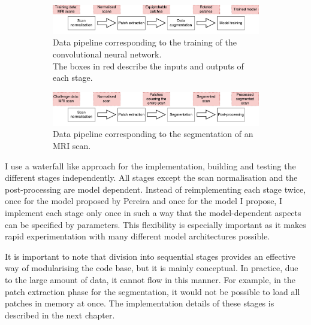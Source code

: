 \documentclass[12pt,a4paper,twoside,openright]{report}
\begin{document}
\begin{figure}[h]
	\captionsetup{justification=centering}
	\centering
	\begin{subfigure}[b]{\textwidth}
		\includegraphics[width=\textwidth]{training_implementation_pipeline}
		\caption[Data pipeline corresponding to the training of the convolutional neural network.]{Data pipeline corresponding to the training of the convolutional neural network. \\The boxes in red describe the inputs and outputs of each stage.}
		\label{fig:training_implementation_pipeline}
	\end{subfigure}
	\qquad		
	
	\begin{subfigure}[b]{\textwidth}
		\includegraphics[width=\textwidth]{segmentation_implementation_pipeline}
		\caption{Data pipeline corresponding to the segmentation of an MRI scan.}
		\label{fig:segmentation_implementation_pipeline}
	\end{subfigure}
	\caption{}
\end{figure}

I use a waterfall like approach for the implementation, building and testing the different stages independently. All stages except the scan normalisation and the post-processing are model dependent. Instead of reimplementing each stage twice, once for the model proposed by Pereira and once for the model I propose, I implement each stage only once in such a way that the model-dependent aspects can be specified by parameters. This flexibility is especially important as it makes rapid experimentation with many different model architectures possible.

It is important to note that division into sequential stages provides an effective way of modularising the code base, but it is mainly conceptual. In practice, due to the large amount of data, it cannot flow in this manner. For example, in the patch extraction phase for the segmentation, it would not be possible to load all patches in memory at once. The implementation details of these stages is described in the next chapter.
\end{document}
